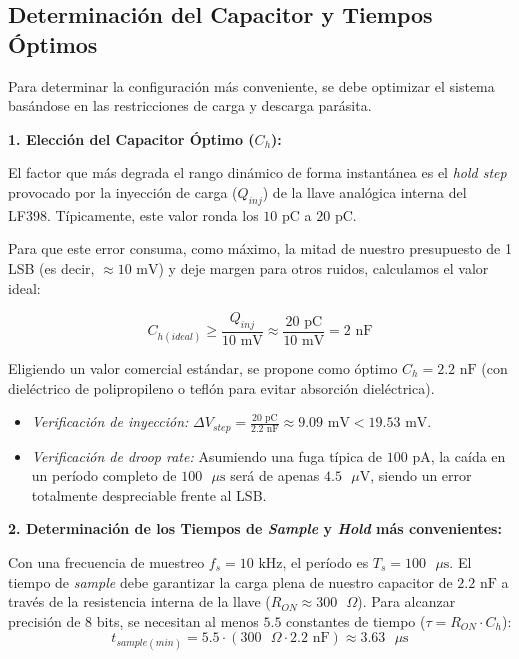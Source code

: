 \subsection{Determinación del Capacitor y Tiempos Óptimos}

Para determinar la configuración más conveniente, se debe optimizar el sistema basándose en las restricciones de carga y descarga parásita.

\textbf{1. Elección del Capacitor Óptimo ($C_h$):}

El factor que más degrada el rango dinámico de forma instantánea es el \textit{hold step} provocado por la inyección de carga ($Q_{inj}$) de la llave analógica interna del LF398. Típicamente, este valor ronda los $10\text{ pC}$ a $20\text{ pC}$. 

Para que este error consuma, como máximo, la mitad de nuestro presupuesto de 1 LSB (es decir, $\approx 10\text{ mV}$) y deje margen para otros ruidos, calculamos el valor ideal:

$$ C_{h(ideal)} \ge \frac{Q_{inj}}{10\text{ mV}} \approx \frac{20\text{ pC}}{10\text{ mV}} = 2\text{ nF} $$

Eligiendo un valor comercial estándar, se propone como óptimo \textbf{$C_h = 2.2\text{ nF}$} (con dieléctrico de polipropileno o teflón para evitar absorción dieléctrica). 
\begin{itemize}
	\item \textit{Verificación de inyección:} $\Delta V_{step} = \frac{20\text{ pC}}{2.2\text{ nF}} \approx 9.09\text{ mV} < 19.53\text{ mV}$.
	\item \textit{Verificación de droop rate:} Asumiendo una fuga típica de $100\text{ pA}$, la caída en un período completo de $100\text{ }\mu\text{s}$ será de apenas $4.5\text{ }\mu\text{V}$, siendo un error totalmente despreciable frente al LSB.
\end{itemize}


\textbf{2. Determinación de los Tiempos de \textit{Sample} y \textit{Hold} más convenientes:}

Con una frecuencia de muestreo $f_s = 10\text{ kHz}$, el período es $T_s = 100\text{ }\mu\text{s}$. El tiempo de \textit{sample} debe garantizar la carga plena de nuestro capacitor de $2.2\text{ nF}$ a través de la resistencia interna de la llave ($R_{ON} \approx 300\text{ }\Omega$). Para alcanzar precisión de 8 bits, se necesitan al menos $5.5$ constantes de tiempo ($\tau = R_{ON} \cdot C_h$):
$$ t_{sample(min)} = 5.5 \cdot (300\text{ }\Omega \cdot 2.2\text{ nF}) \approx 3.63\text{ }\mu\text{s} $$

